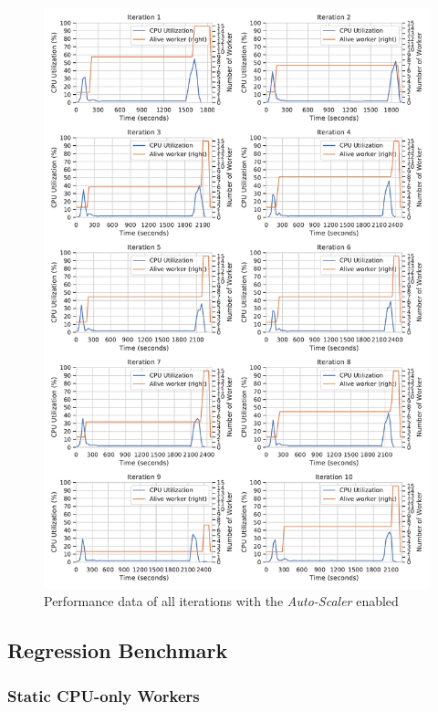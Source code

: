 \begin{figure}[h]
\centering
\includegraphics[scale=0.4]{images/07_evaluation/classification/auto-scaler_performance}
\caption{Performance data of all iterations with the \textit{Auto-Scaler} enabled}
\label{fig:appendix_eval_classification_auto-scaler}
\end{figure}


\subsection{Regression Benchmark}
\label{sec:appendix_eval_regression}

\subsubsection{Static CPU-only Workers}

